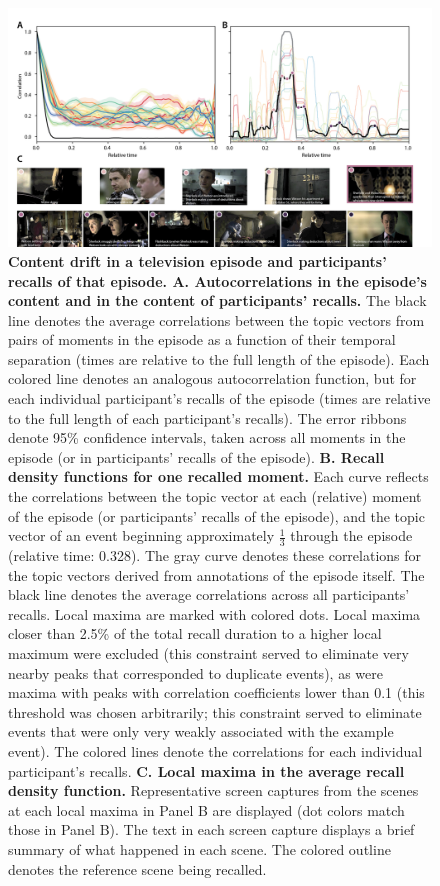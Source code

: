 \documentclass{article}
\begin{document}
\begin{figure}[tp] \centering \includegraphics[width=\textwidth]{figs/reinstatement.png} \caption{\textbf{Content drift in a television episode and participants' recalls of that episode.  A.  Autocorrelations in the episode's content and in the content of participants' recalls.}  The black line denotes the average correlations between the topic vectors from pairs of moments in the episode as a function of their temporal separation (times are relative to the full length of the episode).  Each colored line denotes an analogous autocorrelation function, but for each individual participant's recalls of the episode (times are relative to the full length of each participant's recalls).  The error ribbons denote 95\% confidence intervals, taken across all moments in the episode (or in participants' recalls of the episode).  \textbf{B. Recall density functions for one recalled moment.} Each curve reflects the correlations between the topic vector at each (relative) moment of the episode (or participants' recalls of the episode), and the topic vector of an event beginning approximately $\frac{1}{3}$ through the episode (relative time: 0.328).  The gray curve denotes these correlations for the topic vectors derived from annotations of the episode itself. The black line denotes the average correlations across all participants' recalls.  Local maxima are marked with colored dots.  Local maxima closer than 2.5\% of the total recall duration to a higher local maximum were excluded (this constraint served to eliminate very nearby peaks that corresponded to duplicate events), as were maxima with peaks with correlation coefficients lower than 0.1 (this threshold was chosen arbitrarily; this constraint served to eliminate events that were only very weakly associated with the example event).   The colored lines denote the correlations for each individual participant's recalls.  \textbf{C. Local maxima in the average recall density function.}  Representative screen captures from the scenes at each local maxima in Panel B are displayed (dot colors match those in Panel B).  The text in each screen capture displays a brief summary of what happened in each scene. The colored outline denotes the reference scene being recalled.}

\end{figure}
\end{document}
